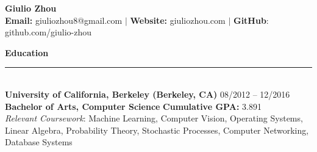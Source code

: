 \documentclass{article}
\begin{document}
\newcommand{\HRule}{\rule{\linewidth}{0.2mm}}


\begin{center}
\textbf{{\LARGE Giulio Zhou}} \\ 
\textbf{\fontsize{11}{13.2} Email:} giuliozhou8@gmail.com  $|$ \textbf{Website:} giuliozhou.com $|$ \textbf{GitHub}: github.com/giulio-zhou\\[2mm]
\end{center}


\normalsize
\noindent
\textbf{{\Large Education}}\\[-2mm]
\HRule\\
\textbf{University of California, Berkeley (Berkeley, CA)}
\hfill 08/2012 -- 12/2016 \\
\indent
\textbf{Bachelor of Arts, Computer Science}  
\hfill{\textbf{Cumulative GPA: }3.891}\\
\textit{Relevant Coursework}: Machine Learning, Computer Vision, Operating Systems, Linear Algebra, Probability Theory, Stochastic Processes, Computer Networking, Database Systems
\\
\end{document}
